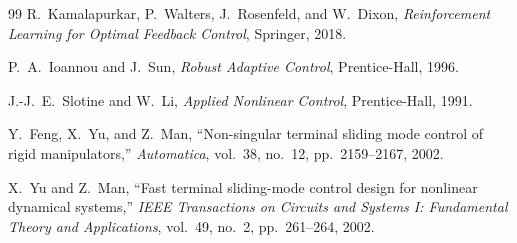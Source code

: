 \documentclass[12pt,a4paper]{article}
\begin{document}
\begin{thebibliography}{99}
R.~Kamalapurkar, P.~Walters, J.~Rosenfeld, and W.~Dixon,
\textit{Reinforcement Learning for Optimal Feedback Control},
Springer, 2018.

P.~A.~Ioannou and J.~Sun,
\textit{Robust Adaptive Control},
Prentice-Hall, 1996.

J.-J.~E.~Slotine and W.~Li,
\textit{Applied Nonlinear Control},
Prentice-Hall, 1991.

Y.~Feng, X.~Yu, and Z.~Man,
``Non-singular terminal sliding mode control of rigid manipulators,''
\textit{Automatica}, vol.~38, no.~12, pp.~2159--2167, 2002.

X.~Yu and Z.~Man,
``Fast terminal sliding-mode control design for nonlinear dynamical systems,''
\textit{IEEE Transactions on Circuits and Systems I: Fundamental Theory and Applications}, vol.~49, no.~2, pp.~261--264, 2002.

\end{thebibliography}
\end{document}
